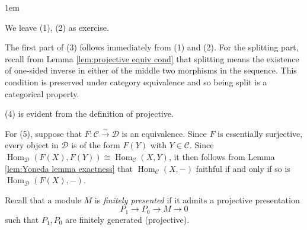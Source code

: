 \documentclass[11pt,a4paper]{article}
\makeatletter
\numberwithin{equation}{section}
\renewenvironment{proof}[1][\proofname]{\par
    \pushQED{\qed}%
    \normalfont \topsep0\p@\@plus6\p@ \labelsep1em\relax
    \trivlist
    \item[\hskip\labelsep\indent
        \bfseries #1]\ignorespaces
    \mbox{}
}{
    \popQED\endtrivlist\@endpefalse
}
\theoremstyle{all}
\theoremstyle{remark}
\newcommand{\CC}{\mathcal{C}}
\newcommand{\Hom}{\operatorname{Hom}\nolimits}
\DeclareMathOperator{\Mod}{\mathsf{Mod}}
\newcommand{\defn}[1]{\textsl{\color{darkblue} #1}}
\makeatother
\begin{document}
\begin{proof}
We leave (1), (2) as exercise.

The first part of (3) follows immediately from (1) and (2).
For the splitting part, recall from Lemma \ref{lem:projective equiv cond} that splitting means the existence of one-sided inverse in either of the middle two morphisms in the sequence. This condition is preserved under category equivalence and so being split is a categorical property.

(4) is evident from the definition of projective.

For (5), suppose that $F:\CC\xrightarrow{\sim} \mathcal{D}$ is an equivalence. 
Since $F$ is essentially surjective, every object in $\mathcal{D}$ is of the form $F(Y)$ with $Y\in \CC$.
Since $\Hom_{\mathcal{D}}(F(X),F(Y))\cong \Hom_\CC(X,Y)$, it then follows from Lemma \ref{lem:Yoneda lemma exactness} that $\Hom_\CC(X,-)$ faithful if and only if so is $\Hom_{\mathcal{D}}(F(X),-)$.
\end{proof}

Recall that a module $M$ is \defn{finitely presented} if it admits a projective presentation
\[
P_1\to P_0 \to M\to 0
\]
such that $P_1, P_0$ are finitely generated (projective).
\end{document}
